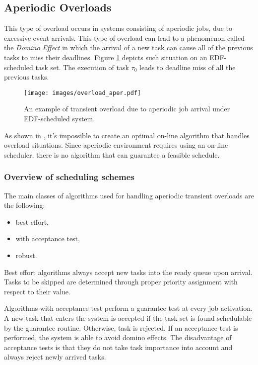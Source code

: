 \subsection{Aperiodic Overloads}
This type of overload occurs in systems consisting of aperiodic jobs, due to excessive event arrivals. 
This type of overload can lead to a phenomenon called the \textit{Domino Effect} in which the arrival of a new task can cause all of the previous tasks to miss their deadlines. 
Figure \ref{aperiodic} depicts such situation on an EDF-scheduled task set. 
The execution of task $\tau_0$ leads to deadline miss of all the previous tasks.

\begin{figure}[ht]
    \centering
    \texttt{[image: images/overload\_aper.pdf]}
    \caption{An example of transient overload due to aperiodic job arrival under EDF-scheduled system.}
    \label{aperiodic}
\end{figure}

As shown in \cite{buttazzo2011hard}, it's impossible to create an optimal on-line algorithm that handles overload situations.
Since aperiodic environment requires using an on-line scheduler, there is no algorithm that can guarantee a feasible schedule.

\subsubsection{Overview of scheduling schemes}
The main classes of algorithms used for handling aperiodic transient overloads are the following:
\begin{itemize}
    \item{best effort,}
    \item{with acceptance test,}
    \item{robust.}
\end{itemize}
Best effort algorithms always accept new tasks into the ready queue upon arrival. Tasks to be skipped are determined through proper priority assignment with respect to their value.

Algorithms with acceptance test perform a guarantee test at every job activation. 
A new task that enters the system is accepted if the task set is found schedulable by the guarantee routine. Otherwise, task is rejected.
If an acceptance test is performed, the system is able to avoid domino effects.
The disadvantage of acceptance tests is that they do not take task importance into account and always reject newly arrived tasks.

